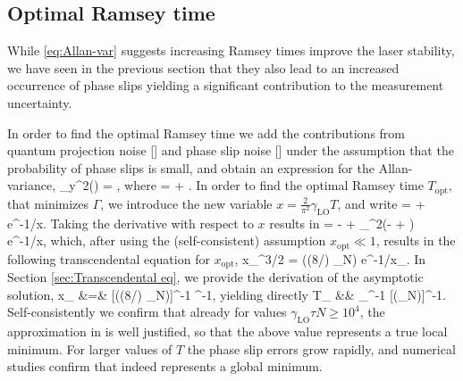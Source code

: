 \subsection{Optimal Ramsey time}
While \eqref{eq:Allan-var} suggests increasing Ramsey times improve the laser stability, we have seen in the previous section that they also lead to an increased occurrence of phase slips yielding a significant contribution to the measurement uncertainty.

In order to find the optimal Ramsey time
we add the contributions from quantum projection noise
[] and phase slip noise [] under the assumption that the
probability of phase slips is small, and obtain an expression for the
Allan-variance, 
\bel
\label{eq:EK9}
\sigma_y^2(\tau) = \Gamma,
\eel
 where
\bel
\label{eq:abc}
	\Gamma =  +
	\sqrt{32\pi}
	\exp{}.
	\eel
In order to find the optimal Ramsey time $T_\mathrm{opt}$, that minimizes
$\Gamma$, we introduce the new variable $x = \frac{2}{\pi^2}\gamma_\mathrm{LO}T$,
and write
\bel
	\Gamma =  + 
	 e^{-1/x}.
\eel
Taking the derivative with respect to $x$ results in
\bel
	\Gamma = - +
	\tau\gamma_^2\left(- +
	\right) e^{-1/x},
\eel
which, after using the (self-consistent) assumption $x_\mathrm{opt} \ll 1$, results in the following
transcendental equation for $x_\mathrm{opt}$,
\bel
	x_^{3/2} = ((8/\sqrt{\pi}) \gamma_\tau N)
	e^{-1/x_}.
\eel
In Section \ref{sec:Transcendental eq},
 we provide the derivation of the asymptotic solution,
\bal
	x_ &=& [\log((8/\sqrt{\pi}) \gamma_\tau N)]^{-1} ^{-1},
\eal
yielding directly
\bal
\label{eq:T_opt}
	T_ &\approx& \gamma_^{-1}
	[\log(\gamma_\tau N)]^{-1}.
\eal
Self-consistently we confirm that already for values $\gamma_\mathrm{LO}\tau N\geq 10^4$, the approximation 
in  is well justified, so that the above value represents a true local minimum. 
For larger values of $T$ the phase slip errors grow rapidly, and numerical studies confirm that  indeed represents a global minimum.

